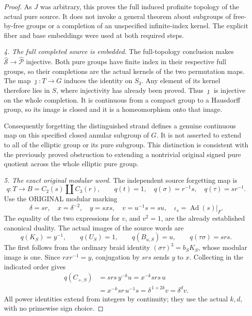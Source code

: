 \begin{proof}
As \(J\) was arbitrary, this proves the full induced
profinite topology of the actual pure source. It does not
invoke a general theorem about subgroups of free-by-free
groups or a completion of an unspecified infinite-index
kernel. The explicit fiber and base embeddings were used
at both required steps.

\emph{4. The full completed source is embedded.}
The full-topology conclusion makes
\(\widehat{\mathcal S}\to\widehat{\mathcal P}\)
injective. Both pure groups have finite index in their
respective full groups, so their completions are the
actual kernels of the two permutation maps.
The map \(\jmath:T\to G\) induces the identity on \(S_3\).
Any element of its kernel therefore lies in \(S\), where
injectivity has already been proved. Thus \(\jmath\)
is injective on the whole completion.
It is continuous from a compact group to a Hausdorff
group, so its image is closed and it is a homeomorphism
onto that image.

Consequently forgetting the distinguished strand defines
a genuine continuous map on this specified closed annular
subgroup of \(G\). It is not asserted to extend to all of
the elliptic group or its pure subgroup. This distinction
is consistent with the previously proved obstruction to
extending a nontrivial original signed pure quotient
across the whole elliptic pure group.

\emph{5. The exact original modular word.}
The independent source forgetting map is
\[
 q:T\longrightarrow B=C_2(s)\amalg C_3(r),\qquad
 q(t)=1,\quad q(\sigma)=r^{-1}s,\quad q(\tau)=sr^{-1}.
 \tag{A.134.24}
\]
Use the ORIGINAL modular marking
\[
 \delta=sr,\quad x=\delta^{-2},\quad y=sxs,\quad
 v=u^{-1}s=su,\quad
 \iota_s=\operatorname{Ad}(s)|_F.
 \tag{A.134.25}
\]
The equality of the two expressions for \(v\), and \(v^2=1\),
are the already established canonical duality.
The actual images of the source words are
\[
 q(K_S)=y^{-1},\qquad q(U_S)=1,\qquad
 q(B_{u,S})=u,\qquad q(\tau\sigma)=srs.
 \tag{A.134.26}
\]
The first follows from the ordinary braid identity
\((\sigma\tau)^3=b_SK_S\), whose modular image is one.
Since \(rxr^{-1}=y\), conjugation by \(srs\) sends \(y\)
to \(x\). Collecting in the indicated order gives
\[
 \begin{aligned}
 q(C_{+,S})
 &=srs\,y^{-k}u
  =x^{-k}srs\,u\\
 &=x^{-k}sr\,u^{-1}s
  =\delta^{\,1+2k}v
  =\delta^d v.
 \end{aligned}
 \tag{A.134.27}
\]
All power identities extend from integers by continuity;
they use the actual \(k,d\), with no primewise sign choice.


\end{proof}
